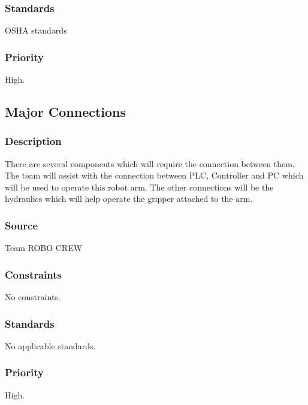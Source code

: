 \subsubsection{Standards}
OSHA standards 
\subsubsection{Priority}
High.

\subsection{Major Connections}
\subsubsection{Description}
There are several components which will require the connection between them. The team will assist with the connection between PLC, Controller and PC which will be used to operate this robot arm. The other connections will be the hydraulics which will help operate the gripper attached to the arm. \subsubsection{Source}
Team ROBO CREW 
\subsubsection{Constraints}
No constraints.
\subsubsection{Standards}
No applicable standards. 
\subsubsection{Priority}
High.